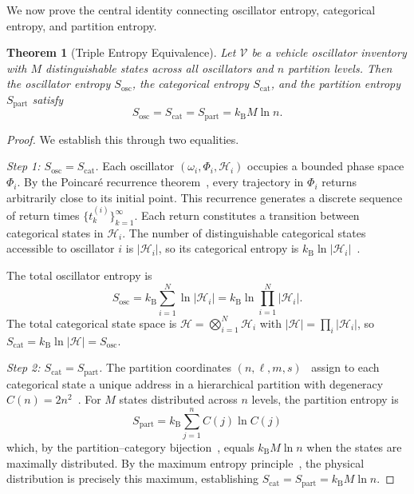 \documentclass[twocolumn,10pt]{article}
\newtheorem{theorem}{Theorem}[section]
\theoremstyle{definition}
\theoremstyle{remark}
\newcommand{\Sosc}{S_{\mathrm{osc}}}
\newcommand{\Scat}{S_{\mathrm{cat}}}
\newcommand{\Spart}{S_{\mathrm{part}}}
\newcommand{\kB}{k_{\mathrm{B}}}
\begin{document}
We now prove the central identity connecting oscillator entropy, categorical
entropy, and partition entropy.

\begin{theorem}[Triple Entropy Equivalence]\label{thm:triple-entropy}
Let $\mathcal{V}$ be a vehicle oscillator inventory with $M$ distinguishable
states across all oscillators and $n$ partition levels. Then the oscillator
entropy $\Sosc$, the categorical entropy $\Scat$, and the partition entropy
$\Spart$ satisfy
\begin{equation}\label{eq:triple-entropy}
  \Sosc = \Scat = \Spart = \kB M \ln n.
\end{equation}
\end{theorem}

\begin{proof}
We establish this through two equalities.

\emph{Step 1: $\Sosc = \Scat$.} Each oscillator $(\omega_i, \Phi_i,
\mathcal{H}_i)$ occupies a bounded phase space $\Phi_i$. By the Poincar\'e
recurrence theorem~\cite{poincare1890}, every trajectory in $\Phi_i$
returns arbitrarily close to its initial point. This recurrence generates a
discrete sequence of return times $\{t_k^{(i)}\}_{k=1}^{\infty}$. Each
return constitutes a transition between categorical states in $\mathcal{H}_i$.
The number of distinguishable categorical states accessible to oscillator
$i$ is $|\mathcal{H}_i|$, so its categorical entropy
is $\kB \ln |\mathcal{H}_i|$~\cite{boltzmann1896}.

The total oscillator entropy is
\begin{equation}
  \Sosc = \kB \sum_{i=1}^{N} \ln |\mathcal{H}_i|
  = \kB \ln \prod_{i=1}^{N} |\mathcal{H}_i|.
\end{equation}
The total categorical state space is $\mathcal{H} = \bigotimes_{i=1}^N
\mathcal{H}_i$ with $|\mathcal{H}| = \prod_i |\mathcal{H}_i|$, so
$\Scat = \kB \ln |\mathcal{H}| = \Sosc$.

\emph{Step 2: $\Scat = \Spart$.} The partition coordinates
$(n, \ell, m, s)$~\cite{sachikonye2026partition} assign to each categorical
state a unique address in a hierarchical partition with degeneracy
$C(n) = 2n^2$~\cite{sachikonye2026poincare}. For $M$ states distributed
across $n$ levels, the partition entropy is
\begin{equation}
  \Spart = \kB \sum_{j=1}^{n} C(j) \ln C(j)
\end{equation}
which, by the partition--category
bijection~\cite{sachikonye2026partition}, equals $\kB M \ln n$ when the
states are maximally distributed. By the maximum entropy
principle~\cite{jaynes1957}, the physical distribution is precisely this
maximum, establishing $\Scat = \Spart = \kB M \ln n$.
\end{proof}
\end{document}
